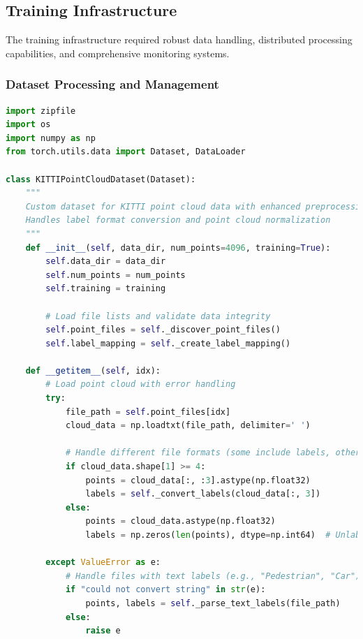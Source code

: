 \documentclass[12pt,a4paper]{report}
\begin{document}
\subsection{Training Infrastructure}

The training infrastructure required robust data handling, distributed processing capabilities, and comprehensive monitoring systems.

\subsubsection{Dataset Processing and Management}

\begin{lstlisting}[caption=Comprehensive Dataset Processing Pipeline, label=lst:dataset_processing, language=python]
import zipfile
import os
import numpy as np
from torch.utils.data import Dataset, DataLoader

class KITTIPointCloudDataset(Dataset):
    """
    Custom dataset for KITTI point cloud data with enhanced preprocessing
    Handles label format conversion and point cloud normalization
    """
    def __init__(self, data_dir, num_points=4096, training=True):
        self.data_dir = data_dir
        self.num_points = num_points
        self.training = training
        
        # Load file lists and validate data integrity
        self.point_files = self._discover_point_files()
        self.label_mapping = self._create_label_mapping()
        
    def __getitem__(self, idx):
        # Load point cloud with error handling
        try:
            file_path = self.point_files[idx]
            cloud_data = np.loadtxt(file_path, delimiter=' ')
            
            # Handle different file formats (some include labels, others don't)
            if cloud_data.shape[1] >= 4:
                points = cloud_data[:, :3].astype(np.float32)
                labels = self._convert_labels(cloud_data[:, 3])
            else:
                points = cloud_data.astype(np.float32)
                labels = np.zeros(len(points), dtype=np.int64)  # Unlabeled data
                
        except ValueError as e:
            # Handle files with text labels (e.g., "Pedestrian", "Car")
            if "could not convert string" in str(e):
                points, labels = self._parse_text_labels(file_path)
            else:
                raise e
        

\end{lstlisting}
\end{document}
